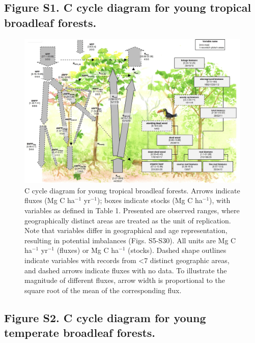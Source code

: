 \documentclass[
]{article}
\begin{document}
\begin{landscape}

\hypertarget{figure-s1.-c-cycle-diagram-for-young-tropical-broadleaf-forests.}{%
\subsection{Figure S1. C cycle diagram for young tropical broadleaf
forests.}\label{figure-s1.-c-cycle-diagram-for-young-tropical-broadleaf-forests.}}

\begin{figure}[H]

{\centering \includegraphics[width=0.84\linewidth]{tables_figures/C_cycle_diagrams/Tropical_broadleaf_YOUNG} 

}

\caption{C cycle diagram for young tropical broadleaf forests. Arrows indicate fluxes (Mg C ha$^{-1}$ yr$^{-1}$); boxes indicate stocks (Mg C ha$^{-1}$), with variables as defined in Table 1. Presented are observed ranges, where geographically distinct areas are treated as the unit of replication. Note that variables differ in geographical and age representation, resulting in potential imbalances (Figs. S5-S30). All units are Mg C ha$^{-1}$ yr$^{-1}$ (fluxes) or Mg C ha$^{-1}$ (stocks). Dashed shape outlines indicate variables with records from <7 distinct geographic areas, and dashed arrows indicate fluxes with no data. To illustrate the magnitude of different fluxes, arrow width is proportional to the square root of the mean of the corresponding flux.}\label{fig:unnamed-chunk-4}
\end{figure}

\hypertarget{figure-s2.-c-cycle-diagram-for-young-temperate-broadleaf-forests.}{%
\subsection{Figure S2. C cycle diagram for young temperate broadleaf
forests.}\label{figure-s2.-c-cycle-diagram-for-young-temperate-broadleaf-forests.}}


\end{landscape}
\end{document}
